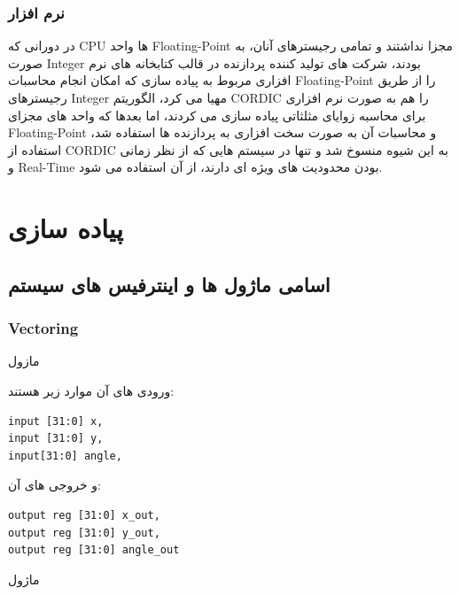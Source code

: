 \documentclass[12pt,titlepage,a4page , tikz , multi,table , svgnames,xcdraw]{article}
\begin{document}
\subsubsection{نرم افزار}

در دورانی که CPU ها واحد Floating-Point مجزا نداشتند و تمامی رجیسترهای آنان، به صورت Integer بودند، شرکت های تولید کننده پردازنده در قالب کتابخانه های نرم افزاری مربوط به پیاده سازی  که امکان انجام محاسبات Floating-Point را از طریق رجیسترهای Integer مهیا می کرد، الگوریتم CORDIC را هم به صورت نرم افزاری برای محاسبه زوایای مثلثاتی پیاده سازی می کردند، اما بعدها که واحد های مجزای Floating-Point و محاسبات آن به صورت سخت افزاری به پردازنده ها استفاده شد، استفاده از CORDIC به این شیوه منسوخ شد و تنها در سیستم هایی که از نظر زمانی و Real-Time بودن محدودیت های ویژه ای دارند، از آن استفاده می شود. \cite{wikipedia}


\newpage


\section{پیاده سازی}
\subsection{اسامی ماژول ها و اینترفیس های سیستم}

\subsubsection{Vectoring}


 
 مازول  

 ورودی های آن موارد زیر هستند:

\begin{latin}
\begin{verbatim}
input [31:0] x,
input [31:0] y,
input[31:0] angle,
\end{verbatim}
\end{latin}

و خروجی های آن:

\begin{latin}
\begin{verbatim}
output reg [31:0] x_out,
output reg [31:0] y_out,
output reg [31:0] angle_out
\end{verbatim}
\end{latin}

\hrulefill


ماژول   
 
\end{document}
